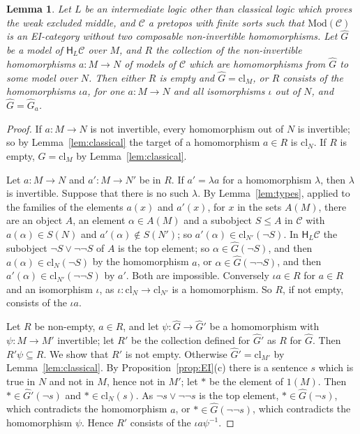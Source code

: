 \documentclass[11pt]{amsart}
\newtheorem{lem}[thm]{Lemma}
\theoremstyle{definition}
\newcommand{\Mod}{\mathrm{Mod}}
\newcommand{\HH}{\mathsf H}
\newcommand{\cC}{\mathcal C}
\newcommand{\cl}{\mathrm{cl}}
\begin{document}
\begin{lem}\label{lem:top}
Let $L$ be an intermediate logic other than classical logic which
proves the weak excluded middle, and $\cC$ a pretopos with finite
sorts such that $\Mod(\cC)$ is an EI-category without two composable
non-invertible homomorphisms. Let $\hat G$ be a model of $\HH_L\cC$
over $M$, and $R$ the collection of the non-invertible homomorphisms
$a\colon M\to N$ of models of $\cC$ which are homomorphisms from
$\hat G$ to some model over $N$. Then either $R$ is empty and $\hat G=
\cl_M$, or $R$ consists of the homomorphisms $\iota a$, for one
$a\colon M\to N$ and all isomorphisms $\iota$ out of $N$, and
$\hat G=\hat G_a$.
\end{lem}
\begin{proof}
If $a\colon M\to N$ is not invertible, every homomorphism out of $N$
is invertible; so by Lemma~\ref{lem:classical} the target of a
homomorphism $a\in R$ is $\cl_N$. If $R$ is empty, $\hat G=\cl_M$ by
Lemma~\ref{lem:classical}.

Let $a\colon M\to N$ and $a'\colon M\to N'$ be in $R$. If $a'=\lambda
a$ for a homomorphism $\lambda$, then $\lambda$ is invertible. Suppose
that there is no such $\lambda$. By Lemma~\ref{lem:types}, applied to
the families of the elements $a(x)$ and $a'(x)$, for $x$ in the sets
$A(M)$, there are an object $A$, an element $\alpha\in A(M)$ and a
subobject $S\le A$ in $\cC$ with $a(\alpha)\in S(N)$ and
$a'(\alpha)\notin S(N')$; so $a'(\alpha)\in\cl_{N'}(\neg S)$. In
$\HH_L\cC$ the subobject $\neg S\vee\neg\neg S$ of $A$ is the top
element; so $\alpha\in\hat G(\neg S)$, and then $a(\alpha)\in
\cl_N(\neg S)$ by the homomorphism $a$, or $\alpha\in\hat G(\neg\neg
S)$, and then $a'(\alpha)\in\cl_{N'}(\neg\neg S)$ by $a'$. Both are
impossible. Conversely $\iota a\in R$ for $a\in R$ and an isomorphism
$\iota$, as $\iota\colon\cl_N\to\cl_{N'}$ is a homomorphism. So $R$,
if not empty, consists of the $\iota a$.

Let $R$ be non-empty, $a\in R$, and let $\psi\colon\hat G\to\hat G'$
be a homomorphism with $\psi\colon M\to M'$ invertible; let $R'$ be
the collection defined for $\hat G'$ as $R$ for $\hat G$. Then
$R'\psi\subseteq R$. We show that $R'$ is not empty. Otherwise
$\hat G'=\cl_{M'}$ by Lemma~\ref{lem:classical}. By
Proposition~\ref{prop:EI}(c) there is a sentence $s$ which is true in
$N$ and not in $M$, hence not in $M'$; let $\ast$ be the element of
$1(M)$. Then $\ast\in\hat G'(\neg s)$ and $\ast\in\cl_N(s)$. As $\neg
s\vee\neg\neg s$ is the top element, $\ast\in\hat G(\neg s)$, which
contradicts the homomorphism $a$, or $\ast\in\hat G(\neg\neg s)$,
which contradicts the homomorphism $\psi$. Hence $R'$ consists of the
$\iota a\psi^{-1}$.


\end{proof}
\end{document}
